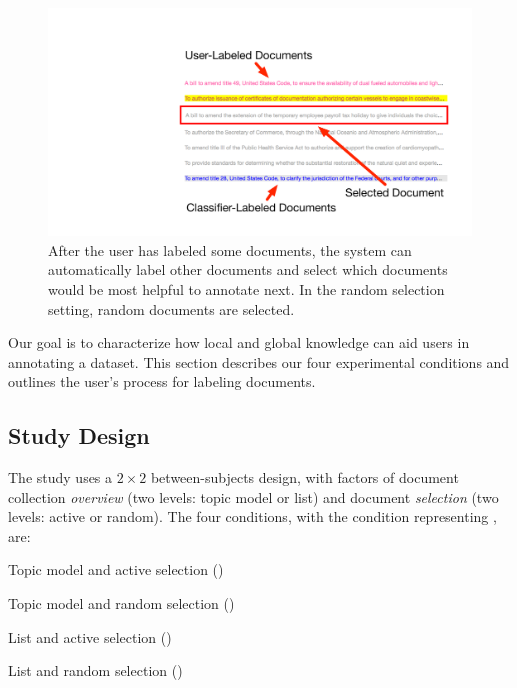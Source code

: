 \begin{figure}[t!]

  \begin{center}
  \includegraphics[width=\linewidth]{2016_acl_doclabel/figures/ui_doc_highlight}
  \end{center}
  \caption{After the user has labeled some documents, the system can
    automatically label other documents and select which documents
    would be most helpful to annotate next.  In the random selection
    setting, random documents are selected.}
\label{fig:UI-highlight}
\end{figure}

Our goal is to characterize how local and global knowledge can aid
users in annotating a dataset.  This section describes our four
experimental conditions and outlines the user's process for labeling documents.

\subsection{Study Design}
\label{sub:exp_conditions}





The study uses a $2\times2$ between-subjects design, with factors of
document collection \emph{overview} (two levels: topic model or list)
and document \emph{selection} (two levels: active or random). The four
conditions, with the 
condition representing \name{}, are:
\begin{enumerate*}
  \item Topic model and active selection ()
  \item Topic model and random selection ()
  \item List and active selection ()
  \item List and random selection ()
\end{enumerate*}

